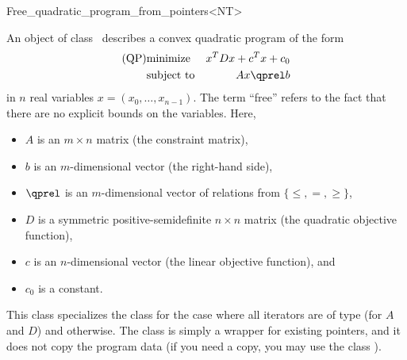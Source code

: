 \begin{ccRefClass}{Free_quadratic_program_from_pointers<NT>}


\ccDefinition
An object of class \ccRefName\ describes a convex quadratic program of the form
\begin{eqnarray*}
\mbox{(QP)}& \mbox{minimize} & x^{T}Dx+c^{T}x+c_0 \\
&\mbox{subject to}   & Ax\qprel b
\end{eqnarray*}
in $n$ real variables $x=(x_0,\ldots,x_{n-1})$. The term ``free'' refers
to the fact that there are no explicit bounds on the variables.
Here, 
\begin{itemize}
\item $A$ is an $m\times n$ matrix (the constraint matrix), 
\item $b$ is an $m$-dimensional vector (the right-hand side),
\item $\qprel$ is an $m$-dimensional vector of relations 
from $\{\leq, =, \geq\}$, 
\item $D$ is a symmetric positive-semidefinite $n\times n$ matrix (the
  quadratic objective function),
\item $c$ is an $n$-dimensional vector (the linear objective
  function), and 
\item $c_0$ is a constant.
\end{itemize}

This class specializes the class
 for the case where all iterators are of type 
 (for
$A$ and $D$) and  otherwise. The class is simply a wrapper for 
existing pointers, and it does not copy the program data (if you need
a copy, you may use the class ).

\ccIsModel
{}

\ccSeeAlso
{}\\

\end{ccRefClass}
